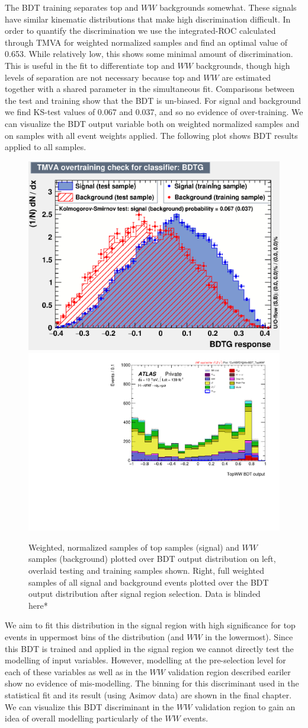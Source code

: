 The BDT training separates top and $WW$ backgrounds somewhat. These signals have similar kinematic distributions that make high discrimination difficult. In order to quantify the discrimination we use the integrated-ROC calculated through TMVA for weighted normalized samples and find an optimal value of 0.653. While relatively low, this shows some minimal amount of discrimination. This is useful in the fit to differentiate top and $WW$ backgrounds, though high levels of separation are not necessary because top and $WW$ are estimated together with a shared parameter in the simultaneous fit. Comparisons between the test and training show that the BDT is un-biased. For signal and background we find KS-test values of 0.067 and 0.037, and so no evidence of over-training. We can visualize the BDT output variable both on weighted normalized samples and on samples with all event weights applied. The following plot shows BDT results applied to all samples.

\begin{figure}[!htbp]
\centering
  \includegraphics[width=.45\linewidth]{Pictures/TopvsWW/overtrain_BDTG.eps}
  \includegraphics[width=.35\linewidth]{Pictures/run2-emme-CutVBFDYjjMin-BDT_TopWW-lin.pdf}
\caption{Weighted, normalized samples of top samples (signal) and $WW$ samples (background) plotted over BDT output distribution on left, overlaid testing and training samples shown. Right, full weighted samples of all signal and background events plotted over the BDT output distribution after signal region selection. Data is blinded here*}
\label{fig:WWBDTresult}
\end{figure}

We aim to fit this distribution in the signal region with high significance for top events in uppermost bins of the distribution (and $WW$ in the lowermost). Since this BDT is trained and applied in the signal region we cannot directly test the modelling of input variables. However, modelling at the pre-selection level for each of these variables as well as in the $WW$ validation region described eariler show no evidence of mis-modelling. The binning for this discriminant used in the statistical fit and its result (using Asimov data) are shown in the final chapter. We can visualize this BDT discriminant in the $WW$ validation region to gain an idea of overall modelling particularly of the $WW$ events.

